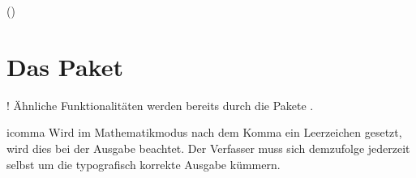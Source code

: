 \documentclass[english,ngerman,ToDo=no]{tudscrman3}
\begin{document}
() 

\section{Das Paket }
\begin{Declaration*}{}!
Ähnliche Funktionalitäten werden bereits durch die Pakete .
\end{Declaration*}

\begin{packages}
  \item[icomma]
    Wird im Mathematikmodus nach dem Komma ein Leerzeichen gesetzt, wird dies 
    bei der Ausgabe beachtet. Der Verfasser muss sich demzufolge jederzeit 
    selbst um die typografisch korrekte Ausgabe kümmern.
\end{packages}

\clearpage
\makeatletter
\@printindex[options]
\@printindex[files]
\end{document}
